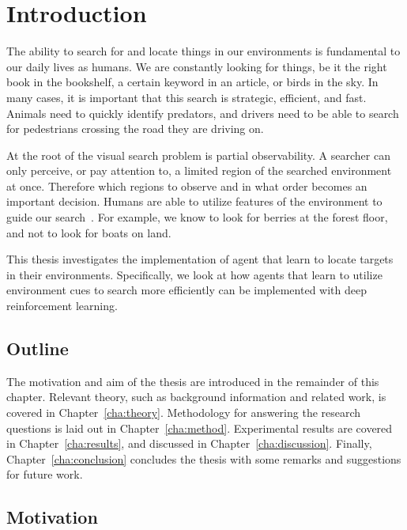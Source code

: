 \chapter{Introduction}
\label{cha:introduction}

The ability to search for and locate things in our environments is fundamental to our daily lives as humans.
We are constantly looking for things, be it the right book in the bookshelf, a certain keyword in an article, or birds in the sky.
In many cases, it is important that this search is strategic, efficient, and fast.
Animals need to quickly identify predators, and drivers need to be able to search for pedestrians crossing the road they are driving on.

At the root of the visual search problem is partial observability.
A searcher can only perceive, or pay attention to, a limited region of the searched environment at once.
Therefore which regions to observe and in what order becomes an important decision. 
Humans are able to utilize features of the environment to guide our search~\cite{wolfe_five_2017,eckstein_visual_2011,nakayama_situating_2011}.
For example, we know to look for berries at the forest floor, and not to look for boats on land.

This thesis investigates the implementation of agent that learn to locate targets in their environments.
Specifically, we look at how agents that learn to utilize environment cues to search more efficiently can be implemented with deep reinforcement learning.

\section{Outline}
\label{sec:outline}

The motivation and aim of the thesis are introduced in the remainder of this chapter. 
Relevant theory, such as background information and related work, is covered in Chapter~\ref{cha:theory}.
Methodology for answering the research questions is laid out in Chapter~\ref{cha:method}.
Experimental results are covered in Chapter~\ref{cha:results}, and discussed in Chapter~\ref{cha:discussion}.
Finally, Chapter~\ref{cha:conclusion} concludes the thesis with some remarks and suggestions for future work.

\section{Motivation}
\label{sec:motivation}

